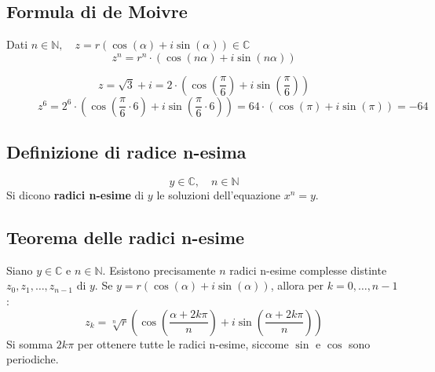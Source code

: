 \documentclass[a4paper]{article}
\theoremstyle{break}
\theoremstyle{break}
\theoremstyle{break}
\theoremstyle{break}
\begin{document}
\subsection{Formula di de Moivre}
Dati \( n \in \mathbb{N}, \quad z = r(\cos(\alpha) + i \sin(\alpha)) \in \mathbb{C} \)
\[
	z^n = r^n \cdot (\cos(n\alpha) + i \sin(n\alpha))
\]

\begin{figure}[H]
	\begin{example}
		\[
			z = \sqrt{3} + i = 2 \cdot \left( \cos(\frac{\pi}{6}) + i \sin(\frac{\pi}{6}) \right)
		\]
		\[
			z^6 = 2^6 \cdot \left( \cos(\frac{\pi}{6} \cdot 6) + i \sin(\frac{\pi}{6} \cdot 6) \right) = 64 \cdot \left( \cos(\pi) + i \sin(\pi) \right) = -64
		\]
	\end{example}
\end{figure}

\subsection{Definizione di radice n-esima}
\[
	y \in  \mathbb{C}, \quad n \in \mathbb{N}
\]
Si dicono \textbf{radici n-esime} di \( y \) le soluzioni dell'equazione \( x^n = y \).

\subsection{Teorema delle radici n-esime}
Siano \( y \in \mathbb{C} \) e \( n \in \mathbb{N} \). Esistono precisamente \( n \) radici n-esime
complesse distinte \( z_0, z_1, \ldots, z_{n-1} \) di \( y \). Se \( y = r(\cos(\alpha)+i\sin(\alpha)) \),
allora per \( k = 0, \ldots, n-1 \) :
\[
	z_k = \sqrt[n]{r} \left( \cos\left(\frac{\alpha + 2k\pi}{n}\right) + i \sin\left(\frac{\alpha + 2k\pi}{n}\right) \right)
\]
Si somma \( 2k \pi  \) per ottenere tutte le radici n-esime, siccome \( \sin \) e \( \cos \) sono periodiche.
\end{document}
